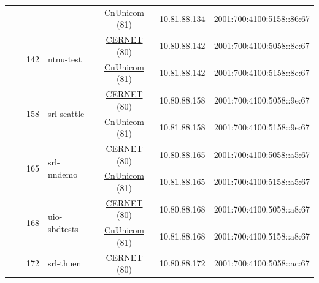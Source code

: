 \begin{small}
\begin{center}
\begin{longtable}{|c|c|c|c|c|c|c|c|}
  &  &  &  & \multicolumn{2}{|c|}{\tiny{\href{http://www.chinaunicom.com}{CnUnicom} (81)}} & \tiny{10.81.88.134} & \tiny{2001:700:4100:5158::86:67} \\* \cline{3-3}\cline{4-4}\cline{5-5}\cline{6-6}\cline{7-7}\cline{8-8}
  &  & \multirow{2}{*}{\tiny{142}} & \multicolumn{1}{|l|}{\multirow{2}{*}{\tiny{ntnu-test}}} & \multicolumn{2}{|c|}{\tiny{\href{http://www.cernet.edu.cn}{CERNET} (80)}} & \tiny{10.80.88.142} & \tiny{2001:700:4100:5058::8e:67} \\* \cline{5-5}\cline{6-6}\cline{7-7}\cline{8-8}
  &  &  &  & \multicolumn{2}{|c|}{\tiny{\href{http://www.chinaunicom.com}{CnUnicom} (81)}} & \tiny{10.81.88.142} & \tiny{2001:700:4100:5158::8e:67} \\* \cline{3-3}\cline{4-4}\cline{5-5}\cline{6-6}\cline{7-7}\cline{8-8}
  &  & \multirow{2}{*}{\tiny{158}} & \multicolumn{1}{|l|}{\multirow{2}{*}{\tiny{srl-seattle}}} & \multicolumn{2}{|c|}{\tiny{\href{http://www.cernet.edu.cn}{CERNET} (80)}} & \tiny{10.80.88.158} & \tiny{2001:700:4100:5058::9e:67} \\* \cline{5-5}\cline{6-6}\cline{7-7}\cline{8-8}
  &  &  &  & \multicolumn{2}{|c|}{\tiny{\href{http://www.chinaunicom.com}{CnUnicom} (81)}} & \tiny{10.81.88.158} & \tiny{2001:700:4100:5158::9e:67} \\* \cline{3-3}\cline{4-4}\cline{5-5}\cline{6-6}\cline{7-7}\cline{8-8}
  &  & \multirow{2}{*}{\tiny{165}} & \multicolumn{1}{|l|}{\multirow{2}{*}{\tiny{srl-nndemo}}} & \multicolumn{2}{|c|}{\tiny{\href{http://www.cernet.edu.cn}{CERNET} (80)}} & \tiny{10.80.88.165} & \tiny{2001:700:4100:5058::a5:67} \\* \cline{5-5}\cline{6-6}\cline{7-7}\cline{8-8}
  &  &  &  & \multicolumn{2}{|c|}{\tiny{\href{http://www.chinaunicom.com}{CnUnicom} (81)}} & \tiny{10.81.88.165} & \tiny{2001:700:4100:5158::a5:67} \\* \cline{3-3}\cline{4-4}\cline{5-5}\cline{6-6}\cline{7-7}\cline{8-8}
  &  & \multirow{2}{*}{\tiny{168}} & \multicolumn{1}{|l|}{\multirow{2}{*}{\tiny{uio-sbdtests}}} & \multicolumn{2}{|c|}{\tiny{\href{http://www.cernet.edu.cn}{CERNET} (80)}} & \tiny{10.80.88.168} & \tiny{2001:700:4100:5058::a8:67} \\* \cline{5-5}\cline{6-6}\cline{7-7}\cline{8-8}
  &  &  &  & \multicolumn{2}{|c|}{\tiny{\href{http://www.chinaunicom.com}{CnUnicom} (81)}} & \tiny{10.81.88.168} & \tiny{2001:700:4100:5158::a8:67} \\* \cline{3-3}\cline{4-4}\cline{5-5}\cline{6-6}\cline{7-7}\cline{8-8}
  &  & \multirow{2}{*}{\tiny{172}} & \multicolumn{1}{|l|}{\multirow{2}{*}{\tiny{srl-thuen}}} & \multicolumn{2}{|c|}{\tiny{\href{http://www.cernet.edu.cn}{CERNET} (80)}} & \tiny{10.80.88.172} & \tiny{2001:700:4100:5058::ac:67} \\* \cline{5-5}\cline{6-6}\cline{7-7}\cline{8-8}

\end{longtable}
\end{center}
\end{small}
